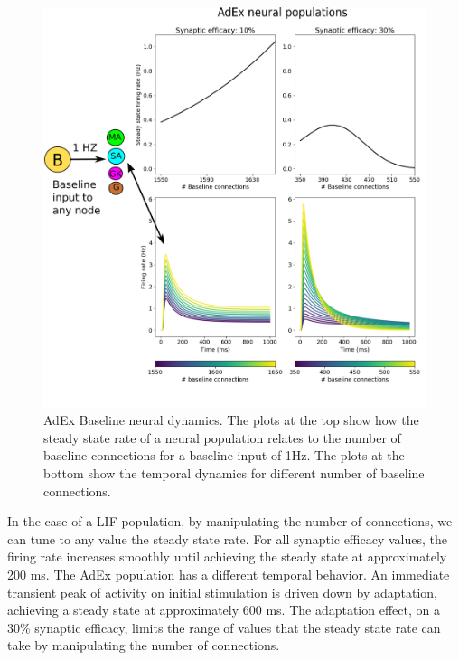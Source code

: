 \documentclass[10pt]{article}
\begin{document}
\begin{figure}[h!]
  \begin{center}
    \includegraphics[width=1.00\columnwidth]{figures/baseline_dynamics_adex.png}
    \caption{AdEx Baseline neural dynamics.
      The plots at the top show how the steady state rate of a neural population relates to the number of baseline connections for a baseline input of 1Hz.
      The plots at the bottom show the temporal dynamics for different number of baseline connections.}
    \label{fig:baseline_dynamics_adex}

  \end{center}
\end{figure}


In the case of a LIF population, by manipulating the number of connections, we can tune to any value the steady state rate.
For all synaptic efficacy values, the firing rate increases smoothly until achieving the steady state at approximately 200 ms.
The AdEx population has a different temporal behavior.
An immediate transient peak of activity on initial stimulation is driven down by adaptation, achieving a steady state at approximately 600 ms.
The adaptation effect, on a 30\% synaptic efficacy, limits the range of values that the steady state rate can take by manipulating the number of connections.
\end{document}
